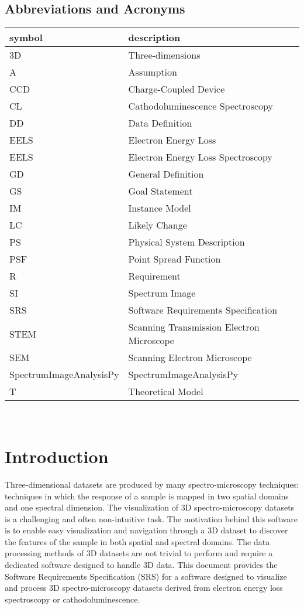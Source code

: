 \documentclass[12pt]{article}
\newcommand{\progname}{SpectrumImageAnalysisPy} %
\begin{document}
\subsection{Abbreviations and Acronyms}

\renewcommand{\arraystretch}{1.2}
\begin{tabular}{l l} 
  \toprule		
  \textbf{symbol} & \textbf{description}\\
  \midrule 
  3D & Three-dimensions\\
  A & Assumption\\
  CCD & Charge-Coupled Device\\
  CL & Cathodoluminescence Spectroscopy\\
  DD & Data Definition\\
  EELS & Electron Energy Loss\\
  EELS & Electron Energy Loss Spectroscopy\\
  GD & General Definition\\
  GS & Goal Statement\\
  IM & Instance Model\\
  LC & Likely Change\\
  PS & Physical System Description\\
  PSF & Point Spread Function\\
  R & Requirement\\
  SI & Spectrum Image\\
  SRS & Software Requirements Specification\\
  STEM & Scanning Transmission Electron Microscope\\
  SEM & Scanning Electron Microscope\\
  \progname{} & SpectrumImageAnalysisPy\\
  T & Theoretical Model\\
  \bottomrule
\end{tabular}\\

\newpage
{}

\section{Introduction}
Three-dimensional datasets are produced by many spectro-microscopy techniques: techniques in which the response of a sample is mapped in two spatial domains and one spectral dimension. The visualization of 3D spectro-microscopy datasets is a challenging and often non-intuitive task. The motivation behind this software is to enable easy visualization and navigation through a 3D dataset to discover the features of the sample in both spatial and spectral domains. The data processing methods of 3D datasets are not trivial to perform and require a dedicated software designed to handle 3D data. This document provides the Software Requirements Specification (SRS) for a software designed to visualize and process 3D spectro-microscopy datasets derived from electron energy loss spectroscopy or cathodoluminescence.
\end{document}

